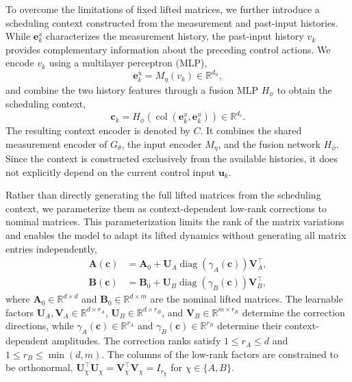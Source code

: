 \documentclass[journal]{IEEEtran}
\newcommand{\ve}{\mathbf{e}}
\newcommand{\vu}{\mathbf{u}}
\newcommand{\vc}{\mathbf{c}}
\newcommand{\mA}{\mathbf{A}}
\newcommand{\mB}{\mathbf{B}}
\newcommand{\mU}{\mathbf{U}}
\newcommand{\mV}{\mathbf{V}}
\newcommand{\R}{\mathbb{R}}
\newcommand{\col}{\operatorname{col}}
\theoremstyle{plain}
\theoremstyle{definition}
\theoremstyle{definition}
\begin{document}
To overcome the limitations of fixed lifted matrices, we further
introduce a scheduling context constructed from the measurement
and past-input histories. While $\ve_k^x$ characterizes the
measurement history, the past-input history $v_k$ provides
complementary information about the preceding control actions.
We encode $v_k$ using a multilayer perceptron (MLP),
\begin{equation}
\ve_k^u=M_\eta(v_k)\in\R^{d_u},
\label{eq:input_history_feature}
\end{equation}
and combine the two history features through a fusion MLP
$H_\phi$ to obtain the scheduling context,
\begin{equation}
\vc_k=H_\phi\left(\col(\ve_k^x,\ve_k^u)\right)
\in\R^{d_c}.
\label{eq:fused_context}
\end{equation}
The resulting context encoder is denoted by $C$.
It combines the shared measurement encoder of $G_\theta$,
the input encoder $M_\eta$, and the fusion network $H_\phi$.
Since the context is constructed exclusively from the available
histories, it does not explicitly depend on the current control
input $\vu_k$.

Rather than directly generating the full lifted matrices from
the scheduling context, we parameterize them as context-dependent
low-rank corrections to nominal matrices. This parameterization
limits the rank of the matrix variations and enables the model
to adapt its lifted dynamics without generating all matrix
entries independently,
\begin{align}
\mA(\vc)&=\mA_0+
\mU_A\operatorname{diag}(\gamma_A(\vc))\mV_A^\top,
\label{eq:scheduled_A}\\
\mB(\vc)&=\mB_0+
\mU_B\operatorname{diag}(\gamma_B(\vc))\mV_B^\top,
\label{eq:scheduled_B}
\end{align}
where $\mA_0\in\R^{d\times d}$ and $\mB_0\in\R^{d\times m}$
are the nominal lifted matrices. The learnable factors
$\mU_A,\mV_A\in\R^{d\times r_A}$,
$\mU_B\in\R^{d\times r_B}$, and $\mV_B\in\R^{m\times r_B}$
determine the correction directions, while
$\gamma_A(\vc)\in\R^{r_A}$ and $\gamma_B(\vc)\in\R^{r_B}$
determine their context-dependent amplitudes. The correction
ranks satisfy $1\leq r_A\leq d$ and $1\leq r_B\leq\min(d,m)$.
The columns of the low-rank factors are constrained to be orthonormal,
$\mU_\chi^\top\mU_\chi=\mV_\chi^\top\mV_\chi=I_{r_\chi}$
for $\chi\in\{A,B\}$.
\end{document}
